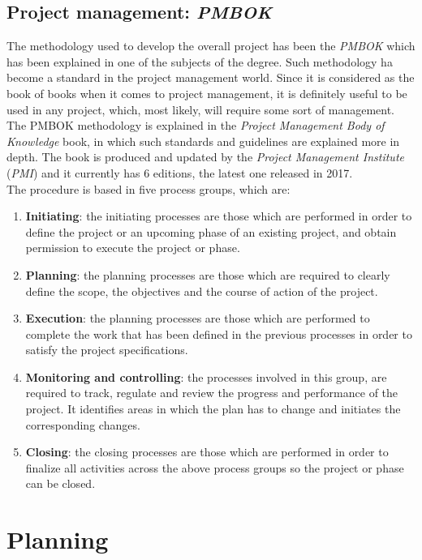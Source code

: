 \documentclass[a4paper,12pt]{book}
\begin{document}
\section{Project management: \emph{PMBOK}}
The methodology used to develop the overall project has been the \emph{PMBOK} which has been explained in one of the subjects of the degree. Such methodology ha become a standard in the project management world. Since it is considered as the book of books when it comes to project management, it is definitely useful to be used in any project, which, most likely, will require some sort of management.
\\[8pt]
The PMBOK methodology is explained in the \emph{Project Management Body of Knowledge} book, in which such standards and guidelines are explained more in depth. The book is produced and updated by the \emph{Project Management Institute} (\emph{PMI}) and it currently has 6 editions, the latest one released in 2017.
\\[8pt]
The procedure is based in five process groups, which are:
\begin{enumerate}[label = \arabic{*}.]
	\item \textbf{Initiating}: the initiating processes are those which are performed in order to define the project or an upcoming phase of an existing project, and obtain permission to execute the project or phase.
	\item \textbf{Planning}: the planning processes are those which are required to clearly define the scope, the objectives and the course of action of the project.
	\item \textbf{Execution}: the planning processes are those which are performed to complete the work that has been defined in the previous processes in order to satisfy the project specifications.
	\item \textbf{Monitoring and controlling}: the processes involved in this group, are required to track, regulate and review the progress and performance of the project. It identifies areas in which the plan has to change and initiates the corresponding changes.
	\item \textbf{Closing}: the closing processes are those which are performed in order to finalize all activities across the above process groups so the project or phase can be closed.
\end{enumerate}
\chapter{Planning}
\end{document}
